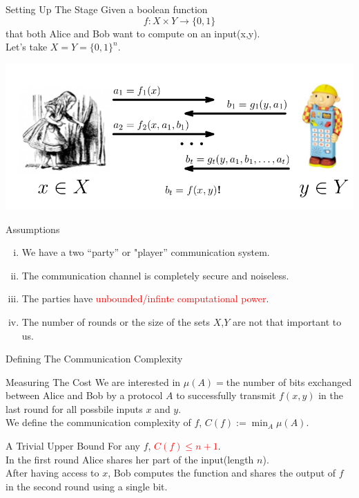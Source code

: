 \documentclass[9pt]{beamer}
\begin{document}
\begin{frame}{Setting Up The Stage}
  Given a boolean function $$f:X\times Y\to\{0,1\}$$ that both Alice and Bob want 
  to compute on an 
  input(x,y). \\
  Let's take $X=Y=\{0,1\}^n$.
  \begin{center}
    \includegraphics[scale=0.25]{alice_bob.png}
  \end{center}
  \pause
  \begin{block}{Assumptions}
    \begin{enumerate}[i)]
    \item We have a two ``party'' or "player'' communication system. 
      \pause
    \item The communication channel is completely secure and noiseless. 
      \pause
    \item The parties have \textcolor{red}{unbounded/infinte computational power}.
      \pause
    \item The number of rounds or the size of the sets $X$,$Y$ are not that 
      important to us.
    \end{enumerate}
  \end{block}
\end{frame}


\begin{frame}{Defining The Communication Complexity}
  \begin{block}{Measuring The Cost}
    We are interested in $\mu(A)=$the number of bits exchanged between Alice and 
    Bob by a 
    protocol $A$ to successfully
    transmit $f(x,y)$ in the last round for all possbile inputs $x$ and $y$.\\
    \pause
    We define the communication complexity of $f$, $C(f):=\min_{A}\mu (A)$.
  \end{block}
  \pause
  \begin{block}{A Trivial Upper Bound}
    For any $f$, \textcolor{red}{$C(f)\leq n+1$}.\\
    \pause
    In the first round Alice shares her part of the input(length $n$).\\
    \pause
    After having access to $x$, Bob computes the function and shares the output of 
    $f$ in the 
    second round using a single bit.
  \end{block}
  
\end{frame}
\end{document}
